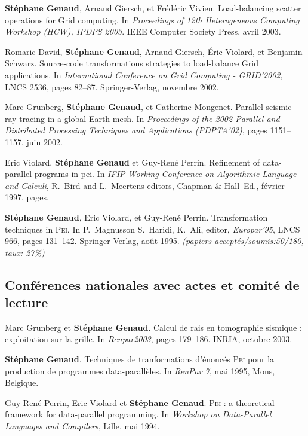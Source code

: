 \documentclass[11pt]{article}
\begin{document}
\begin{thebibliography}{99}
\textbf{Stéphane Genaud}, Arnaud Giersch, et Frédéric Vivien.
\newblock Load-balancing scatter operations for Grid computing.
\newblock In {\em Proceedings of 12th Heterogeneous Computing Workshop 
(HCW), IPDPS 2003}. IEEE Computer Society Press, avril 2003.

Romaric David, \textbf{Stéphane Genaud}, Arnaud Giersch, \'{E}ric Violard, et 
  Benjamin Schwarz.
\newblock Source-code transformations strategies to load-balance Grid
  applications.
\newblock In {\em International Conference on Grid Computing - GRID'2002}, 
LNCS 2536, pages 82--87. Springer-Verlag, novembre 2002.

Marc Grunberg, \textbf{Stéphane Genaud}, et Catherine Mongenet.
\newblock Parallel seismic ray-tracing in a global {E}arth mesh.
\newblock In {\em Proceedings of the 2002 Parallel and Distributed Processing
  Techniques and Applications (PDPTA'02)}, pages 1151--1157, juin 2002.

Eric Violard, \textbf{Stéphane Genaud} et Guy-René Perrin.
\newblock Refinement of data-parallel programs in pei.
\newblock In {\em IFIP Working Conference on Algorithmic Language and Calculi}, 
R.~Bird and L.~Meertens editors, Chapman \& Hall~Ed., février 1997.
 pages.

\textbf{Stéphane Genaud}, Eric Violard, et Guy-René Perrin.
\newblock Transformation techniques in \textsc{Pei}.
\newblock In P.~Magnusson S.~Haridi, K.~Ali, editor, {\em Europar'95}, LNCS
  966, pages 131--142. Springer-Verlag, août 1995.
\newblock \small{\textit{(papiers acceptés/soumis:50/180, taux: 27\%)}}




\subsection*{Conférences nationales avec actes et comité de lecture}
Marc Grunberg et \textbf{Stéphane Genaud}.
\newblock Calcul de rais en tomographie sismique : exploitation sur la grille.
\newblock In {\em Renpar2003}, pages 179--186. INRIA, octobre 2003.

\textbf{Stéphane Genaud}.
\newblock Techniques de tranformations d'énoncés \textsc{Pei} pour la
  production de programmes data-parallèles.
\newblock In {\em RenPar 7}, mai 1995, Mons, Belgique.

Guy-René Perrin, Eric Violard et \textbf{Stéphane Genaud}.
\newblock \textsc{Pei} : a theoretical framework for data-parallel programming.
\newblock In {\em Workshop on Data-Parallel Languages and Compilers}, Lille, 
mai 1994.
\vspace{3mm}



\end{thebibliography}
\end{document}
